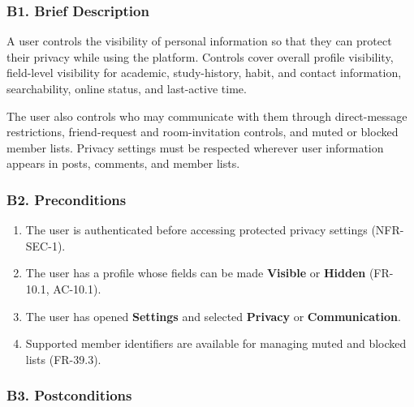 \documentclass[12pt]{article}
\begin{document}
\hypertarget{sec:b1-brief-description}{}
\subsubsection*{B1. Brief Description}
\par\medskip

A user controls the visibility of personal information so that they can protect their privacy while using the platform. Controls cover overall profile visibility, field-level visibility for academic, study-history, habit, and contact information, searchability, online status, and last-active time.
\par\medskip

The user also controls who may communicate with them through direct-message restrictions, friend-request and room-invitation controls, and muted or blocked member lists. Privacy settings must be respected wherever user information appears in posts, comments, and member lists.
\par\medskip

\hypertarget{sec:b2-preconditions}{}
\subsubsection*{B2. Preconditions}
\par\medskip

\begin{enumerate}
\item The user is authenticated before accessing protected privacy settings (NFR-SEC-1).
\item The user has a profile whose fields can be made \textbf{Visible} or \textbf{Hidden} (FR-10.1, AC-10.1).
\item The user has opened \textbf{Settings} and selected \textbf{Privacy} or \textbf{Communication}.
\item Supported member identifiers are available for managing muted and blocked lists (FR-39.3).
\end{enumerate}
\par\medskip

\hypertarget{sec:b3-postconditions}{}
\subsubsection*{B3. Postconditions}
\par\medskip
\end{document}
